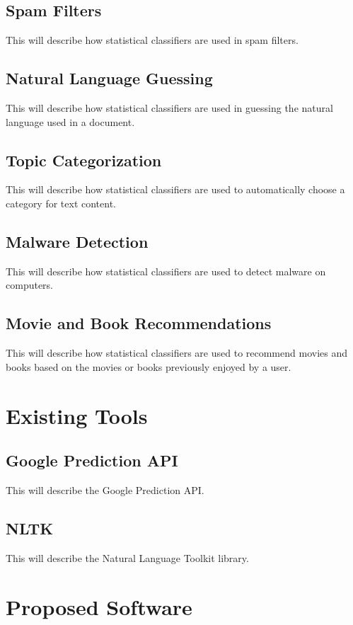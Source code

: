 \documentclass[12pt]{article}
\begin{document}
\subsection{Spam Filters}
This will describe how statistical classifiers are used in spam filters. \cite{androutsopoulos2000evaluation}
\subsection{Natural Language Guessing}
This will describe how statistical classifiers are used in guessing \cite{martins2005language}
the natural language used in a document.
\subsection{Topic Categorization}
This will describe how statistical classifiers are used to automatically choose a category for text
content. \cite{pang2002thumbs}
\subsection{Malware Detection}
This will describe how statistical classifiers are used to detect malware on computers.\\ \cite{perdisci2008mcboost}
\subsection{Movie and Book Recommendations}
This will describe how statistical classifiers are used to recommend movies \cite{basu1998recommendation} and
books \cite{linden2003amazon} based on the movies or books previously enjoyed by a user.
\section{Existing Tools}
\subsection{Google Prediction API}
This will describe the Google Prediction API. \cite{GooglePrediction:2013:Online}
\subsection{NLTK}
This will describe the Natural Language Toolkit library. \cite{NLTK:2013:Online}
\section{Proposed Software}
\end{document}
